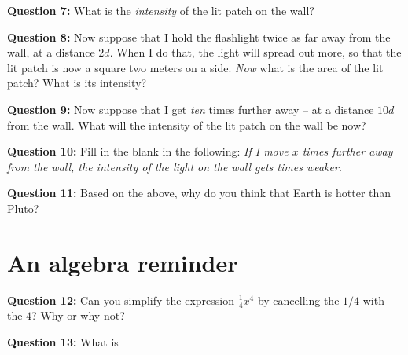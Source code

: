 \documentclass[11pt]{article}
\begin{document}
\vspace{1in}
{\bf Question 7:} What is the {\it intensity} of the lit patch on the wall?

\vspace{1in}
{\bf Question 8:} Now suppose that I hold the flashlight twice as far away from the wall, at a distance $2d$. When I do that,
the light will spread out more, so that the lit patch is now a square two meters on a side. {\it Now} what is the area 
of the lit patch? What is its intensity?

\vspace{1in}
{\bf Question 9:} Now suppose that I get {\it ten} times further away -- at a distance $10d$ from the wall. What will the
intensity of the lit patch on the wall be now? 

\vspace{1in}
{\bf Question 10:} Fill in the blank in the following: {\it If I move $x$ times further away from the wall, the 
intensity of the light on the wall gets \underline{\hspace{1in}} times weaker}. 

\vspace{1in}
{\bf Question 11:} Based on the above, why do you think that Earth is hotter than Pluto?

\vspace{1in}
\section{An algebra reminder}

{\bf Question 12:} Can you simplify the expression $\frac{1}{4} x^4$ by cancelling the $1/4$ with the $4$? Why or why not?

\vspace{1in}

{\bf Question 13:} What is \
\end{document}
